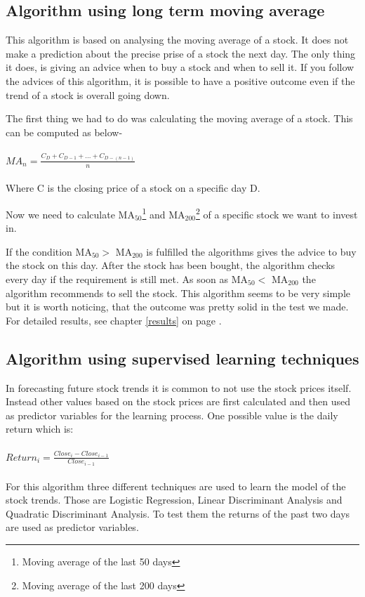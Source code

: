 \documentclass[conference]{IEEEtran}
\begin{document}
\subsection{Algorithm using long term moving average}

This algorithm is based on analysing the moving average of a stock. It does not make a prediction about the precise prise of a stock the next day. The only thing it does, is giving an advice when to buy a stock and when to sell it. If you follow the advices of this algorithm, it is possible to have a positive outcome even if the trend of a stock is overall going down.

The first thing we had to do was calculating the moving average of a stock. This can be computed as below-
\\
\\
$ MA_{n} =  \frac{C_{D} + C_{D-1} + ... + C_{D-(n-1)}}{n} $
\\
\\
Where C is the closing price of a stock on a specific day D.

Now we need to calculate MA$ _{50} $\footnote{Moving average of the last 50 days} and MA$ _{200} $\footnote{Moving average of the last 200 days} of a specific stock we want to invest in.

If the condition MA$ _{50} >$  MA$ _{200} $ is fulfilled the algorithms gives the advice to buy the stock on this day. After the stock has been bought, the algorithm checks every day if the requirement is still met. As soon as MA$ _{50} <$  MA$ _{200} $ the algorithm recommends to sell the stock. This algorithm seems to be very simple but it is worth noticing, that the outcome was pretty solid in the test we made. For detailed results, see chapter \ref{results} on page  \pageref{results}.



\subsection{Algorithm using supervised learning techniques}

In forecasting future stock trends it is common to not use the stock prices itself. Instead other values based on the stock prices are first calculated and then used as predictor variables for the learning process. One possible value is the daily return which is:
\\
\\
$Return_i = \frac{Close_i - Close_{i-1}}{Close_{i-1}}$
\\
\\
For this algorithm three different techniques are used to learn the model of the stock trends. Those are Logistic Regression, Linear Discriminant Analysis and Quadratic Discriminant Analysis. To test them the returns of the past two days are used as predictor variables. 
\end{document}
